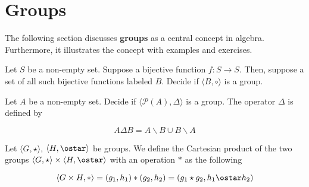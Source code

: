 \section{Groups}

\newcommand{\la}{\langle}
\newcommand{\ra}{\rangle}
\newcommand{\op}{\oplus}
\newcommand{\oo}{\otimes}

\newcommand{\pset}[1]{\mathcal{P}(#1)}

The following section discusses \textbf{groups} as a central concept in algebra.
Furthermore, it illustrates the concept with examples and exercises.

\exercise Let $S$ be a non-empty set. Suppose a bijective function \(f: S
\longrightarrow S\). Then, suppose a set of all such bijective functions
labeled $B$. Decide if \(\la B, \circ \ra\) is a group.

\exercise Let $A$ be a non-empty set. Decide if \(\la \pset{A}, \Delta \ra\) is
a group. The operator $\Delta$ is defined by

\[
  A \Delta B = A \backslash B \cup B \backslash A
\] %

\exercise Let \(\la G, \star \ra\), \(\la H, \ostar \ra\) be groups. We define
the Cartesian product of the two groups \(\la G, \star \ra \times \la H, \ostar
\ra\) with an operation $\ast$ as the following

\[
  \la G \times H, \ast \ra = (g_1, h_1) \ast (g_2, h_2) = (g_1 \star g_2, h_1
  \ostar h_2)
\]

